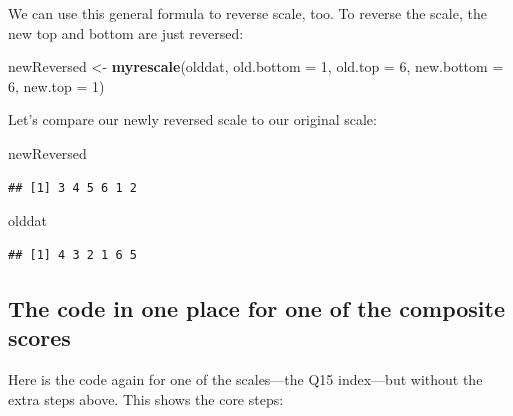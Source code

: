 \documentclass[
]{article}
\newenvironment{Shaded}{\begin{snugshade}}{\end{snugshade}}
\newcommand{\DataTypeTok}[1]{\textcolor[rgb]{0.13,0.29,0.53}{#1}}
\newcommand{\DecValTok}[1]{\textcolor[rgb]{0.00,0.00,0.81}{#1}}
\newcommand{\KeywordTok}[1]{\textcolor[rgb]{0.13,0.29,0.53}{\textbf{#1}}}
\newcommand{\NormalTok}[1]{#1}
\newcommand{\StringTok}[1]{\textcolor[rgb]{0.31,0.60,0.02}{#1}}
\begin{document}
We can use this general formula to reverse scale, too. To reverse the scale, the new top and bottom are just reversed:

\begin{Shaded}
\begin{Highlighting}[]
\NormalTok{newReversed <-}\StringTok{ }\KeywordTok{myrescale}\NormalTok{(olddat, }
                         \DataTypeTok{old.bottom =} \DecValTok{1}\NormalTok{, }
                         \DataTypeTok{old.top    =} \DecValTok{6}\NormalTok{, }
                         \DataTypeTok{new.bottom =} \DecValTok{6}\NormalTok{, }
                         \DataTypeTok{new.top    =} \DecValTok{1}\NormalTok{)}
\end{Highlighting}
\end{Shaded}

Let's compare our newly reversed scale to our original scale:

\begin{Shaded}
\begin{Highlighting}[]
\NormalTok{newReversed}
\end{Highlighting}
\end{Shaded}

\begin{verbatim}
## [1] 3 4 5 6 1 2
\end{verbatim}

\begin{Shaded}
\begin{Highlighting}[]
\NormalTok{olddat}
\end{Highlighting}
\end{Shaded}

\begin{verbatim}
## [1] 4 3 2 1 6 5
\end{verbatim}

\hypertarget{the-code-in-one-place-for-one-of-the-composite-scores}{%
\subsection{The code in one place for one of the composite scores}\label{the-code-in-one-place-for-one-of-the-composite-scores}}

Here is the code again for one of the scales---the Q15 index---but without the extra steps above. This shows the core steps:
\end{document}
